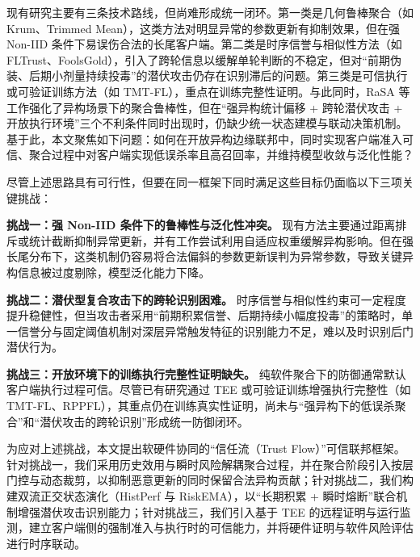 \documentclass[11pt, a4paper, UTF8, fontset=fandol]{ctexart}
\begin{document}
现有研究主要有三条技术路线，但尚难形成统一闭环。第一类是几何鲁棒聚合（如 Krum、Trimmed Mean），这类方法对明显异常的参数更新有抑制效果，但在强 Non-IID 条件下易误伤合法的长尾客户端\cite{blanchard2017krum,yin2018byzantine}。第二类是时序信誉与相似性方法（如 FLTrust、FoolsGold），引入了跨轮信息以缓解单轮判断的不稳定，但对“前期伪装、后期小剂量持续投毒”的潜伏攻击仍存在识别滞后的问题\cite{cao2021fltrust,fung2020foolsgold}。第三类是可信执行或可验证训练方法（如 TMT-FL）\cite{lu2025tmt}，重点在训练完整性证明。与此同时，RaSA\cite{wang2025rasa} 等工作强化了异构场景下的聚合鲁棒性，但在“强异构统计偏移 + 跨轮潜伏攻击 + 开放执行环境”三个不利条件同时出现时，仍缺少统一状态建模与联动决策机制。基于此，本文聚焦如下问题：如何在开放异构边缘联邦中，同时实现客户端准入可信、聚合过程中对客户端实现低误杀率且高召回率，并维持模型收敛与泛化性能？

尽管上述思路具有可行性，但要在同一框架下同时满足这些目标仍面临以下三项关键挑战：

\textbf{挑战一：强 Non-IID 条件下的鲁棒性与泛化性冲突。} 现有方法主要通过距离排斥或统计截断抑制异常更新\cite{blanchard2017krum,yin2018byzantine}，并有工作尝试利用自适应权重缓解异构影响\cite{wang2025rasa}。但在强长尾分布下，这类机制仍容易将合法偏斜的参数更新误判为异常参数，导致关键异构信息被过度剔除，模型泛化能力下降。

\textbf{挑战二：潜伏型复合攻击下的跨轮识别困难。} 时序信誉与相似性约束可一定程度提升稳健性\cite{cao2021fltrust,fung2020foolsgold,dou2025toward}，但当攻击者采用“前期积累信誉、后期持续小幅度投毒”的策略时，单一信誉分与固定阈值机制对深层异常触发特征的识别能力不足，难以及时识别后门潜伏行为。

\textbf{挑战三：开放环境下的训练执行完整性证明缺失。} 纯软件聚合下的防御通常默认客户端执行过程可信。尽管已有研究通过 TEE 或可验证训练增强执行完整性（如 TMT-FL、RPPFL）\cite{lu2025tmt,zhang2025rppfl,r1_tee_integrity}，其重点仍在训练真实性证明，尚未与“强异构下的低误杀聚合”和“潜伏攻击的跨轮识别”形成统一防御闭环。

为应对上述挑战，本文提出软硬件协同的“信任流（Trust Flow）”可信联邦框架。针对挑战一，我们采用历史效用与瞬时风险解耦聚合过程，并在聚合阶段引入按层门控与动态裁剪，以抑制恶意更新的同时保留合法异构贡献；针对挑战二，我们构建双流正交状态演化（HistPerf 与 RiskEMA），以“长期积累 + 瞬时熔断”联合机制增强潜伏攻击识别能力；针对挑战三，我们引入基于 TEE 的远程证明与运行监测，建立客户端侧的强制准入与执行时的可信能力，并将硬件证明与软件风险评估进行时序联动。
\end{document}
